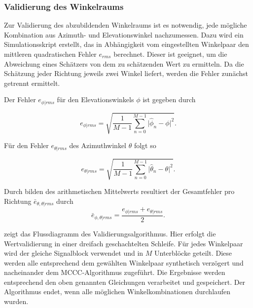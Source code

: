 \subsubsection{Validierung des Winkelraums} 
Zur Validierung des abzubildenden Winkelraums ist es notwendig, jede mögliche Kombination aus Azimuth- und Elevationswinkel nachzumessen. Dazu wird ein Simulationsskript erstellt, das in Abhängigkeit vom eingestellten Winkelpaar den mittleren quadratischen Fehler $e_{rms}$ berechnet. Dieser ist geeignet, um die Abweichung eines Schätzers von dem zu schätzenden Wert zu ermitteln. Da die Schätzung jeder Richtung jeweils zwei Winkel liefert, werden die Fehler zunächst getrennt ermittelt. 

Der Fehler $e_{\phi | rms}$ für den Elevationswinkels $\phi$ ist gegeben durch


\begin{equation}\label{eq:rms_error_phi}
    e_{\phi | rms} = \sqrt{\frac{1}{M-1} \sum_{n=0}^{M-1} \vert \hat \phi_n - \phi \vert^2}.
\end{equation}


Für den Fehler $e_{\theta | rms}$ des Azimuthwinkel $\theta$ folgt so


\begin{equation}\label{eq:rms_error_theta}
    e_{\theta | rms} = \sqrt{\frac{1}{M-1} \sum_{n=0}^{M-1} \vert \hat \theta_n - \theta \vert^2}.
\end{equation}


Durch bilden des arithmetischen Mittelwerts resultiert der Gesamtfehler pro Richtung $\bar e_{\theta, \theta | rms}$ durch
\begin{equation}\label{eq:rms_error_phi_mid}
    \bar e_{\phi, \theta | rms} = \frac{e_{\phi | rms} + e_{\theta | rms}}{2}.
\end{equation}


 zeigt das Flussdiagramm des Validierungsalgorithmus. Hier erfolgt die Wertvalidierung in einer dreifach geschachtelten Schleife. Für jedes Winkelpaar wird der gleiche Signalblock verwendet und in $M$ Unterblöcke geteilt. Diese werden alle entsprechend dem gewählten Winkelpaar synthetisch verzögert und nacheinander dem MCCC-Algorithmus zugeführt. Die Ergebnisse werden entsprechend den oben genannten Gleichungen verarbeitet und gespeichert. Der Algorithmus endet, wenn alle möglichen Winkelkombinationen durchlaufen wurden.


